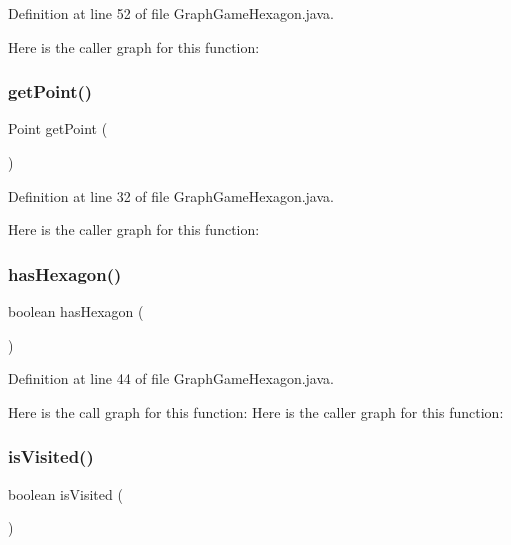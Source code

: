 Definition at line 52 of file Graph\+Game\+Hexagon.\+java.

Here is the caller graph for this function\+:
\mbox{\label{classru_1_1litun_1_1unitingtwist_1_1_graph_game_hexagon_ab83bca143bb78bf22c57d15fdeeb91b3}} 
\subsubsection{get\+Point()}
{\footnotesize\ttfamily Point get\+Point (\begin{DoxyParamCaption}{ }\end{DoxyParamCaption})}



Definition at line 32 of file Graph\+Game\+Hexagon.\+java.

Here is the caller graph for this function\+:
\mbox{\label{classru_1_1litun_1_1unitingtwist_1_1_graph_game_hexagon_ab614a366b275084140dc6b158d395887}} 
\subsubsection{has\+Hexagon()}
{\footnotesize\ttfamily boolean has\+Hexagon (\begin{DoxyParamCaption}{ }\end{DoxyParamCaption})}



Definition at line 44 of file Graph\+Game\+Hexagon.\+java.

Here is the call graph for this function\+:
Here is the caller graph for this function\+:
\mbox{\label{classru_1_1litun_1_1unitingtwist_1_1_graph_game_hexagon_a2d5373d59efa89d4024c56515402d097}} 
\subsubsection{is\+Visited()}
{\footnotesize\ttfamily boolean is\+Visited (\begin{DoxyParamCaption}{ }\end{DoxyParamCaption})}



